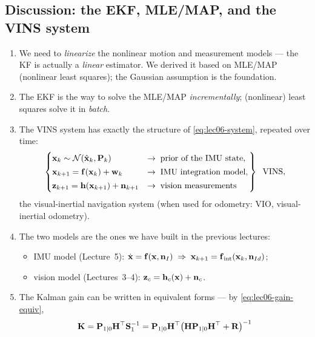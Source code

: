 \subsection{Discussion: the EKF, MLE/MAP, and the VINS system}
\label{sec:lec06-discussion}

\begin{enumerate}[label=(\arabic*),topsep=2pt,itemsep=2pt]
\item We need to \emph{linearize} the nonlinear motion and measurement models --- the KF is actually a \emph{linear} estimator. We derived it based on MLE/MAP (nonlinear least squares); the Gaussian assumption is the foundation.
\item The EKF is the way to solve the MLE/MAP \emph{incrementally}; (nonlinear) least squares solve it in \emph{batch}.
\item The VINS system has exactly the structure of \eqref{eq:lec06-system}, repeated over time:
\begin{align}
\left.
\begin{cases}
\boldsymbol{\mathbf{x}}_k \sim \mathcal{N}(\hat{\boldsymbol{\mathbf{x}}}_k, \boldsymbol{\mathbf{P}}_k) & \to\; \text{prior of the IMU state}, \\[2pt]
\boldsymbol{\mathbf{x}}_{k+1} = \boldsymbol{\mathbf{f}}(\boldsymbol{\mathbf{x}}_k) + \boldsymbol{\mathbf{w}}_k & \to\; \text{IMU integration model}, \\[2pt]
\boldsymbol{\mathbf{z}}_{k+1} = \boldsymbol{\mathbf{h}}(\boldsymbol{\mathbf{x}}_{k+1}) + \boldsymbol{\mathbf{n}}_{k+1} & \to\; \text{vision measurements}
\end{cases}
\right\} \;\; \text{VINS},
\label{eq:lec06-vins}
\end{align}
the visual-inertial navigation system (when used for odometry: VIO, visual-inertial odometry).
\item The two models are the ones we have built in the previous lectures:
\begin{itemize}[noitemsep,topsep=2pt]
\item IMU model (Lecture~5): $\dot{\boldsymbol{\mathbf{x}}} = \boldsymbol{\mathbf{f}}(\boldsymbol{\mathbf{x}}, \boldsymbol{\mathbf{n}}_I) \;\Rightarrow\; \boldsymbol{\mathbf{x}}_{k+1} = \boldsymbol{\mathbf{f}}_{\mathrm{int}}(\boldsymbol{\mathbf{x}}_k, \boldsymbol{\mathbf{n}}_{Id})$;
\item vision model (Lectures~3--4): $\boldsymbol{\mathbf{z}}_c = \boldsymbol{\mathbf{h}}_c(\boldsymbol{\mathbf{x}}) + \boldsymbol{\mathbf{n}}_c$.
\end{itemize}
\item The Kalman gain can be written in equivalent forms --- by \eqref{eq:lec06-gain-equiv},
\begin{align}
\vect{K} = \vect{P}_{1|0}\vect{H}\trans\vect{S}_1^{-1}
= \vect{P}_{1|0}\vect{H}\trans\big(\vect{H}\vect{P}_{1|0}\vect{H}\trans + \vect{R}\big)^{-1}

\end{align}
\end{enumerate}
